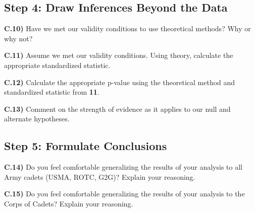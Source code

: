 \documentclass{article}
\newif\ifPrintSolution
\newcommand{\sol}[1]{\ifPrintSolution {\color{blue} #1 } \fi}
\begin{document}
\subsection*{Step 4: Draw Inferences Beyond the Data}

\textbf{C.10)} Have we met our validity conditions to use theoretical methods? Why or why not?

\sol{Yes, for quantitative data we have more than 20 observations and the data is not \textbf{strongly} skewed.}

\vspace{0.25in}

\textbf{C.11)} Assume we met our validity conditions. Using theory, calculate the appropriate standardized statistic.

\sol{ $t = \frac{487 - 480}{\frac{64.7}{\sqrt{293}}}$ = 1.851943}

\vspace{0.35in}

\textbf{C.12)} Calculate the appropriate p-value using the theoretical method and standardized statistic from \textbf{11}.

\sol{$2*(1 - pt(abs(1.851943), 292)) = 0.06504327$}

\vspace{0.35in}

\textbf{C.13)} Comment on the strength of evidence as it applies to our null and alternate hypotheses.

\sol{ With a p-value of 0.065, we have moderate evidence that the true mean of corps of cadets ACFT scores is not equal to 480.}

\vspace{0.25in}

\subsection*{Step 5: Formulate Conclusions}

\textbf{C.14)} Do you feel comfortable generalizing the results of your analysis to all Army cadets (USMA, ROTC, G2G)? Explain your reasoning.

\sol{No, those observational units did not have an equal chance of being selected and so we cannot generalize these results.}

\vspace{0.25in}

\textbf{C.15)} Do you feel comfortable generalizing the results of your analysis to the Corps of Cadets? Explain your reasoning.
\end{document}
